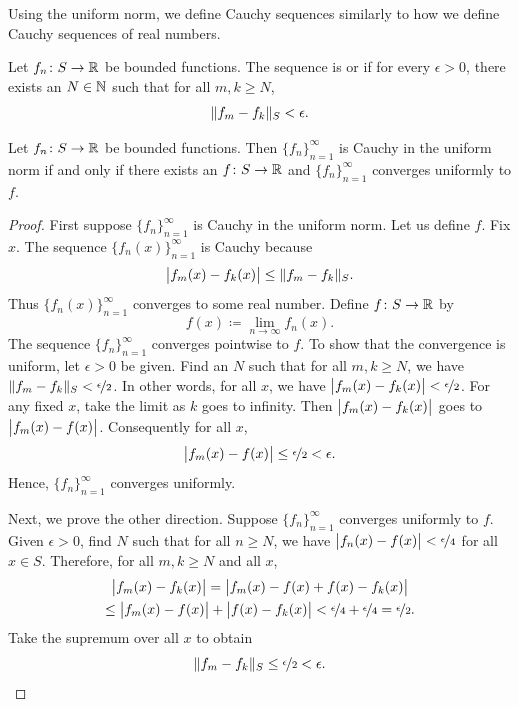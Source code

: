 Using the uniform norm, we define Cauchy sequences similarly to
how we define Cauchy sequences of real numbers.

\begin{defn}
Let $f_n \colon S \to {\mathbb{R}}$ be bounded functions.
The sequence is \emph{}
or \emph{}
if for every $\epsilon > 0$, there exists an $N \in {\mathbb{N}}$ such
that for all $m,k \geq N$,
\begin{equation*}
\lVert {f_m-f_k} \rVert_S < \epsilon .
\end{equation*}
\end{defn}

\begin{prop} \label{prop:uniformcauchy}
Let $f_n \colon S \to {\mathbb{R}}$ be bounded functions.
Then $\{ f_n \}_{n=1}^\infty$ is Cauchy in the uniform norm if and only if
there exists an $f \colon S \to {\mathbb{R}}$ and $\{ f_n \}_{n=1}^\infty$ converges
uniformly to $f$.
\end{prop}

\begin{proof}
First suppose $\{ f_n \}_{n=1}^\infty$ is Cauchy in the uniform norm.
Let us define $f$.  Fix $x$.
The sequence $\bigl\{ f_n(x) \bigr\}_{n=1}^\infty$ is Cauchy because
\begin{equation*}
\bigl\lvert {f_m(x)-f_k(x)} \bigr\rvert
\leq
\lVert {f_m-f_k} \rVert_S .
\end{equation*}
Thus $\bigl\{ f_n(x) \bigr\}_{n=1}^\infty$ converges to some real number.  Define $f \colon S
\to {\mathbb{R}}$ by
\begin{equation*}
f(x) \coloneqq \lim_{n \to \infty} f_n(x) .
\end{equation*}
The sequence
$\{ f_n \}_{n=1}^\infty$ converges pointwise to $f$.  To show that the convergence
is uniform, let $\epsilon > 0$ be given.  Find an $N$ such that
for all $m, k \geq N$, we have
$\lVert {f_m-f_k} \rVert_S < \nicefrac{\epsilon}{2}$.  In other words, for
all $x$, we have
$\bigl\lvert {f_m(x)-f_k(x)} \bigr\rvert < \nicefrac{\epsilon}{2}$.  For any fixed $x$, take the limit
as $k$ goes to infinity.  Then $\bigl\lvert {f_m(x)-f_k(x)} \bigr\rvert$
goes to $\bigl\lvert {f_m(x)-f(x)} \bigr\rvert$.
Consequently for all $x$,
\begin{equation*}
\bigl\lvert {f_m(x)-f(x)} \bigr\rvert \leq \nicefrac{\epsilon}{2} < \epsilon .
\end{equation*}
Hence, $\{ f_n \}_{n=1}^\infty$ converges uniformly.

Next, we prove the other direction.
Suppose $\{ f_n \}_{n=1}^\infty$ converges uniformly to
$f$.  Given $\epsilon > 0$, find $N$ such that for all $n \geq N$,
we have $\bigl\lvert {f_n(x)-f(x)} \bigr\rvert < \nicefrac{\epsilon}{4}$ for all $x \in S$.
Therefore, for all $m, k \geq N$ and all $x$,
\begin{multline*}
\bigl\lvert {f_m(x)-f_k(x)} \bigr\rvert = 
\bigl\lvert {f_m(x)-f(x)+f(x)-f_k(x)} \bigr\rvert
\\
\leq
\bigl\lvert {f_m(x)-f(x)} \bigr\rvert+\bigl\lvert {f(x)-f_k(x)} \bigr\rvert < \nicefrac{\epsilon}{4} +
\nicefrac{\epsilon}{4} = \nicefrac{\epsilon}{2} .
\end{multline*}
Take the supremum over all $x$ to obtain
\begin{equation*}
\lVert {f_m-f_k} \rVert_S \leq \nicefrac{\epsilon}{2} < \epsilon .  \qedhere
\end{equation*}
\end{proof}

